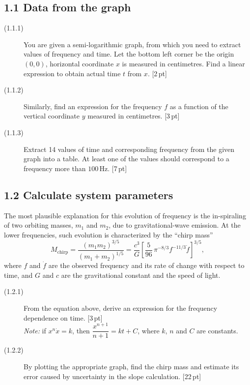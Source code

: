 
\subsection*{1.1 Data from the graph}
\begin{description}
\item[(1.1.1)] You are given a semi-logarithmic graph, from which you need to
  extract values of frequency and time. Let the bottom left corner be the
  origin $(0,0)$, horizontal coordinate $x$ is measured in centimetres. Find a
  linear expression to obtain actual time $t$ from $x$. \hfill[2\,pt]
\item[(1.1.2)] Similarly, find an expression for the frequency $f$ as a
  function of the vertical coordinate $y$ measured in centimetres.
  \hfill[3\,pt]
\item[(1.1.3)] Extract 14 values of time and corresponding frequency from the
  given graph into a table. At least one of the values should correspond to a
  frequency more than $100$\,Hz. \hfill[7\,pt]
\end{description}

\subsection*{1.2 Calculate system parameters}
The most plausible explanation for this evolution of frequency is the
in-spiraling of two orbiting masses, $m_1$ and $m_2$, due to gravitational-wave
emission. At the lower frequencies, such evolution is characterized by the
``chirp mass''
\[ M_{\mathrm{chirp}} = \frac{(m_1 m_2)^{3/5}}{(m_1+m_2)^{1/5}}
   = \frac{c^3}{G}\left[\frac{5}{96}\,\pi^{-8/3} f^{-11/3}\dot{f}\right]^{3/5}, \]
where $f$ and $\dot{f}$ are the observed frequency and its rate of change with
respect to time, and $G$ and $c$ are the gravitational constant and the speed
of light.

\begin{description}
\item[(1.2.1)] From the equation above, derive an expression for the frequency
  dependence on time. \hfill[3\,pt]\\
  \textit{Note:} if $x^n \dot{x} = k$, then $\dfrac{x^{n+1}}{n+1} = kt + C$,
  where $k$, $n$ and $C$ are constants.
\item[(1.2.2)] By plotting the appropriate graph, find the chirp mass and
  estimate its error caused by uncertainty in the slope calculation.
  \hfill[22\,pt]
\end{description}

